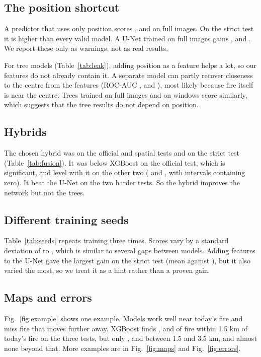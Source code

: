\documentclass[conference]{IEEEtran}
\begin{document}
\subsection{The position shortcut}
A predictor that uses only position scores \rOfficialFullCentrePriorPr, \rSpatialFullCentrePriorPr{} and \rStrictFullCentrePriorPr{} on full images. On the strict test it is higher than every valid model. A U-Net trained on full images gains \rOfficialFullActiveUnetFullpatchMinusUnetDelta, \rSpatialFullActiveUnetFullpatchMinusUnetDelta{} and \rStrictFullActiveUnetFullpatchMinusUnetDelta. We report these only as warnings, not as real results.

For tree models (Table~\ref{tab:leak}), adding position as a feature helps a lot, so our features do not already contain it. A separate model can partly recover closeness to the centre from the features (ROC-AUC \rOfficialLeakRecover, \rSpatialLeakRecover{} and \rStrictLeakRecover), most likely because fire itself is near the centre. Trees trained on full images and on windows score similarly, which suggests that the tree results do not depend on position.

\subsection{Hybrids}
The chosen hybrid was \rOfficialHybridSelected{} on the official and spatial tests and \rStrictHybridSelected{} on the strict test (Table~\ref{tab:fusion}). It was \rOfficialFullActiveHybridMinusXgboostDelta{} below XGBoost on the official test, which is significant, and level with it on the other two (\rSpatialFullActiveHybridMinusXgboostDelta{} and \rStrictFullActiveHybridMinusXgboostDelta, with intervals containing zero). It beat the U-Net on the two harder tests. So the hybrid improves the network but not the trees.

\subsection{Different training seeds}
Table~\ref{tab:seeds} repeats training three times. Scores vary by a standard deviation of \rSeedSdMin{} to \rSeedSdMax, which is similar to several gaps between models. Adding features to the U-Net gave the largest gain on the strict test (mean \rStrictUnetFeaturesSeedMean{} against \rStrictUnetSeedMean), but it also varied the most, so we treat it as a hint rather than a proven gain.

\subsection{Maps and errors}
Fig.~\ref{fig:example} shows one example. Models work well near today's fire and miss fire that moves further away. XGBoost finds \rOfficialRecallNear, \rSpatialRecallNear{} and \rStrictRecallNear{} of fire within 1.5 km of today's fire on the three tests, but only \rOfficialRecallMid, \rSpatialRecallMid{} and \rStrictRecallMid{} between 1.5 and 3.5 km, and almost none beyond that. More examples are in Fig.~\ref{fig:maps} and Fig.~\ref{fig:errors}.
\end{document}
